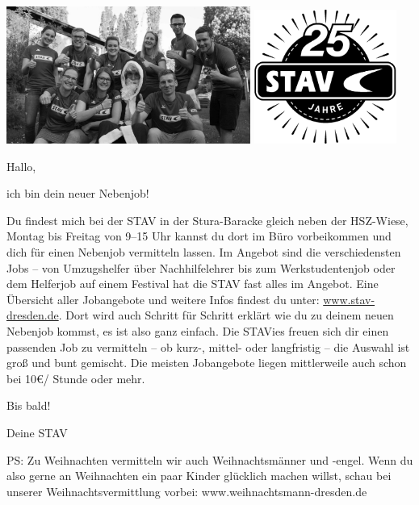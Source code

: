 \includegraphics[width=0.6\textwidth]{./stav-gruppenbild-gray.jpg}
\hfill
\includegraphics[width=0.35\textwidth]{./stav-logo-bw.jpg}

Hallo,

ich bin dein neuer Nebenjob! 

Du findest mich bei der STAV in der Stura-Baracke gleich neben der HSZ-Wiese,
Montag bis Freitag von 9--15 Uhr kannst du dort im Büro vorbeikommen und
dich für einen Nebenjob vermitteln lassen.
Im Angebot sind die verschiedensten Jobs -- von Umzugshelfer über Nachhilfelehrer
bis zum Werkstudentenjob oder dem Helferjob auf einem Festival hat die STAV fast alles im Angebot.
Eine Übersicht aller Jobangebote und weitere Infos findest du unter:
\url{www.stav-dresden.de}.
Dort wird auch Schritt für Schritt erklärt wie du zu deinem neuen Nebenjob kommst,
es ist also ganz einfach.
Die STAVies freuen sich dir einen passenden Job zu vermitteln – ob kurz-, mittel- oder
langfristig – die Auswahl ist groß und bunt gemischt.
Die meisten Jobangebote liegen mittlerweile auch schon bei 10€/ Stunde oder mehr.

Bis bald!

Deine STAV

PS: Zu Weihnachten vermitteln wir auch Weihnachtsmänner und -engel.
Wenn du also gerne an Weihnachten ein paar Kinder glücklich machen willst,
schau bei unserer Weihnachtsvermittlung vorbei: www.weihnachtsmann-dresden.de





